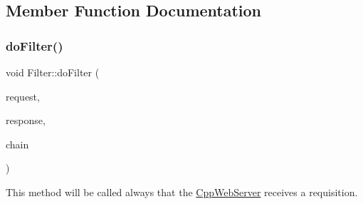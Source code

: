\subsection{Member Function Documentation}
\mbox{\label{class_filter_a4a863b3503070987e9584201973e37a3}} 
\subsubsection{\texorpdfstring{do\+Filter()}{doFilter()}}
{\footnotesize\ttfamily void Filter\+::do\+Filter (\begin{DoxyParamCaption}\item[{C\+W\+F\+::\+Http\+Servlet\+Request \&}]{request,  }\item[{C\+W\+F\+::\+Http\+Servlet\+Response \&}]{response,  }\item[{\mbox{\hyperlink{class_filter_chain}{Filter\+Chain}} \&}]{chain }\end{DoxyParamCaption})\hspace{0.3cm}{\ttfamily [virtual]}}



This method will be called always that the \mbox{\hyperlink{class_cpp_web_server}{Cpp\+Web\+Server}} receives a requisition. 


